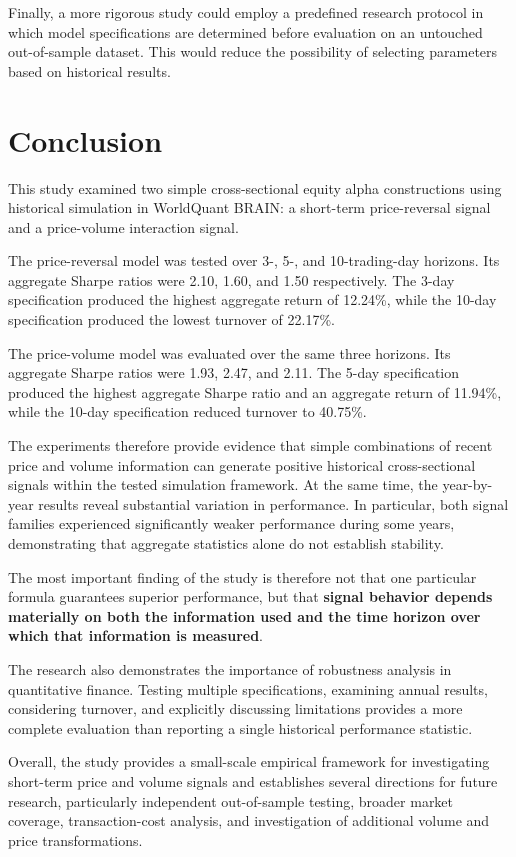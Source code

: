 \documentclass{article}
\begin{document}
Finally, a more rigorous study could employ a predefined research protocol in which model specifications are determined before evaluation on an untouched out-of-sample dataset. This would reduce the possibility of selecting parameters based on historical results.

\section{Conclusion}

This study examined two simple cross-sectional equity alpha constructions using historical simulation in WorldQuant BRAIN: a short-term price-reversal signal and a price-volume interaction signal.

The price-reversal model was tested over 3-, 5-, and 10-trading-day horizons. Its aggregate Sharpe ratios were 2.10, 1.60, and 1.50 respectively. The 3-day specification produced the highest aggregate return of 12.24\%, while the 10-day specification produced the lowest turnover of 22.17\%.

The price-volume model was evaluated over the same three horizons. Its aggregate Sharpe ratios were 1.93, 2.47, and 2.11. The 5-day specification produced the highest aggregate Sharpe ratio and an aggregate return of 11.94\%, while the 10-day specification reduced turnover to 40.75\%.

The experiments therefore provide evidence that simple combinations of recent price and volume information can generate positive historical cross-sectional signals within the tested simulation framework. At the same time, the year-by-year results reveal substantial variation in performance. In particular, both signal families experienced significantly weaker performance during some years, demonstrating that aggregate statistics alone do not establish stability.

The most important finding of the study is therefore not that one particular formula guarantees superior performance, but that \textbf{signal behavior depends materially on both the information used and the time horizon over which that information is measured}.

The research also demonstrates the importance of robustness analysis in quantitative finance. Testing multiple specifications, examining annual results, considering turnover, and explicitly discussing limitations provides a more complete evaluation than reporting a single historical performance statistic.

Overall, the study provides a small-scale empirical framework for investigating short-term price and volume signals and establishes several directions for future research, particularly independent out-of-sample testing, broader market coverage, transaction-cost analysis, and investigation of additional volume and price transformations.
\end{document}
